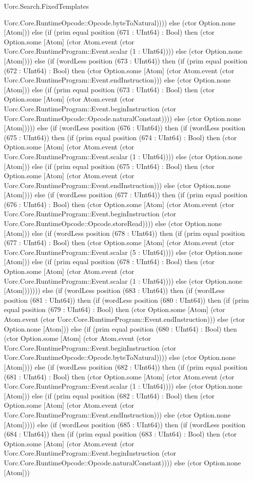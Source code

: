 \begin{lexlean}{Uorc.Search.FixedTemplates}
\begin{semanticmodule}
{Uorc.Core.RuntimeOpcode::Opcode.byteToNatural)))) else (ctor Option.none [Atom])) else (if (prim equal position (671 : UInt64) : Bool) then (ctor Option.some [Atom] (ctor Atom.event (ctor Uorc.Core.RuntimeProgram::Event.scalar (1 : UInt64)))) else (ctor Option.none [Atom]))) else (if (wordLess position (673 : UInt64)) then (if (prim equal position (672 : UInt64) : Bool) then (ctor Option.some [Atom] (ctor Atom.event (ctor Uorc.Core.RuntimeProgram::Event.endInstruction))) else (ctor Option.none [Atom])) else (if (prim equal position (673 : UInt64) : Bool) then (ctor Option.some [Atom] (ctor Atom.event (ctor Uorc.Core.RuntimeProgram::Event.beginInstruction (ctor Uorc.Core.RuntimeOpcode::Opcode.naturalConstant)))) else (ctor Option.none [Atom])))) else (if (wordLess position (676 : UInt64)) then (if (wordLess position (675 : UInt64)) then (if (prim equal position (674 : UInt64) : Bool) then (ctor Option.some [Atom] (ctor Atom.event (ctor Uorc.Core.RuntimeProgram::Event.scalar (1 : UInt64)))) else (ctor Option.none [Atom])) else (if (prim equal position (675 : UInt64) : Bool) then (ctor Option.some [Atom] (ctor Atom.event (ctor Uorc.Core.RuntimeProgram::Event.endInstruction))) else (ctor Option.none [Atom]))) else (if (wordLess position (677 : UInt64)) then (if (prim equal position (676 : UInt64) : Bool) then (ctor Option.some [Atom] (ctor Atom.event (ctor Uorc.Core.RuntimeProgram::Event.beginInstruction (ctor Uorc.Core.RuntimeOpcode::Opcode.storeRead)))) else (ctor Option.none [Atom])) else (if (wordLess position (678 : UInt64)) then (if (prim equal position (677 : UInt64) : Bool) then (ctor Option.some [Atom] (ctor Atom.event (ctor Uorc.Core.RuntimeProgram::Event.scalar (5 : UInt64)))) else (ctor Option.none [Atom])) else (if (prim equal position (678 : UInt64) : Bool) then (ctor Option.some [Atom] (ctor Atom.event (ctor Uorc.Core.RuntimeProgram::Event.scalar (1 : UInt64)))) else (ctor Option.none [Atom])))))) else (if (wordLess position (683 : UInt64)) then (if (wordLess position (681 : UInt64)) then (if (wordLess position (680 : UInt64)) then (if (prim equal position (679 : UInt64) : Bool) then (ctor Option.some [Atom] (ctor Atom.event (ctor Uorc.Core.RuntimeProgram::Event.endInstruction))) else (ctor Option.none [Atom])) else (if (prim equal position (680 : UInt64) : Bool) then (ctor Option.some [Atom] (ctor Atom.event (ctor Uorc.Core.RuntimeProgram::Event.beginInstruction (ctor Uorc.Core.RuntimeOpcode::Opcode.byteToNatural)))) else (ctor Option.none [Atom]))) else (if (wordLess position (682 : UInt64)) then (if (prim equal position (681 : UInt64) : Bool) then (ctor Option.some [Atom] (ctor Atom.event (ctor Uorc.Core.RuntimeProgram::Event.scalar (1 : UInt64)))) else (ctor Option.none [Atom])) else (if (prim equal position (682 : UInt64) : Bool) then (ctor Option.some [Atom] (ctor Atom.event (ctor Uorc.Core.RuntimeProgram::Event.endInstruction))) else (ctor Option.none [Atom])))) else (if (wordLess position (685 : UInt64)) then (if (wordLess position (684 : UInt64)) then (if (prim equal position (683 : UInt64) : Bool) then (ctor Option.some [Atom] (ctor Atom.event (ctor Uorc.Core.RuntimeProgram::Event.beginInstruction (ctor Uorc.Core.RuntimeOpcode::Opcode.naturalConstant)))) else (ctor Option.none [Atom])) }
\end{semanticmodule}
\end{lexlean}
